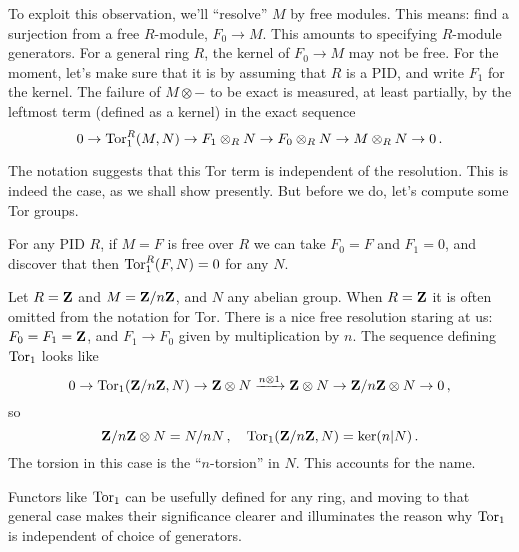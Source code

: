 To exploit this observation, we'll ``resolve'' $M$ by free modules. This means:
find a surjection from a free $R$-module, $F_0\to M$. This amounts to specifying $R$-module generators. For a general ring $R$, the kernel of $F_0\to M$ may
not be free. For the moment,
let's make sure that it is by assuming that $R$ is a PID, and write $F_1$ for
the kernel. The failure of $M\otimes-$ to be exact is measured, at least
partially, by the leftmost term (defined as a kernel) in the exact sequence
\[
0\to\operatorname{Tor}_1^R(M,N)\to F_1\otimes_RN\to F_0\otimes_RN\to M\otimes_RN\to0\,.
\]

The notation suggests that this Tor term is independent of the resolution. 
This is indeed the case, as we shall show presently. But before we do, let's 
compute some Tor groups. 

\begin{example} 
For any PID $R$, if $M=F$ is free over $R$ we can take $F_0=F$
and $F_1=0$, and discover that then $\operatorname{Tor}_1^R(F,N)=0$ for any $N$. 
\end{example}
\begin{example} 
Let $R=\mathbf Z$ and $M=\mathbf Z/n\mathbf Z$, and $N$ any abelian group. When $R=\mathbf Z$ it is often
omitted from the notation for Tor.
There is a nice free resolution staring at us:
$F_0=F_1=\mathbf Z$, and $F_1\to F_0$ given by multiplication by $n$. The sequence
defining $\operatorname{Tor}_1$ looks like 
\[
0\to\operatorname{Tor}_1(\mathbf Z/n\mathbf Z,N)\to\mathbf Z\otimes N\xrightarrow{n\otimes1}\mathbf Z\otimes N\to
\mathbf Z/n\mathbf Z\otimes N\to 0\,,
\]
so
\[
\mathbf Z/n\mathbf Z\otimes N=N/nN\,,\quad\operatorname{Tor}_1(\mathbf Z/n\mathbf Z,N)=\ker(n|N)\,.
\]
The torsion in this case is the ``$n$-torsion'' in $N$. This accounts for
the name.
\end{example}

Functors like $\operatorname{Tor}_1$ can be usefully defined for any ring, and moving to that
general case makes their significance clearer and illuminates the reason why 
$\operatorname{Tor}_1$ is independent of choice of generators. 

